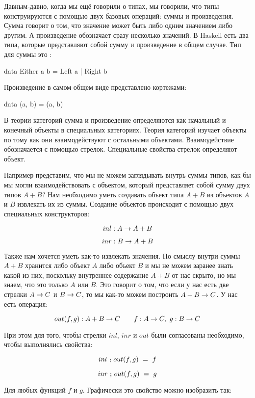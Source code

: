 Давным-давно, когда мы ещё говорили о типах, мы говорили, что типы
конструируются с помощью двух базовых операций: суммы и произведения.
Сумма говорит о том, что значение может быть либо одним значением либо
другим. А произведение обозначает сразу несколько значений. В Haskell
есть два типа, которые представляют собой сумму и произведение в общем
случае. Тип для суммы это :


\begin{code}
data Either a b = Left a | Right b
\end{code}

Произведение в самом общем виде представлено кортежами:


\begin{code}
data (a, b) = (a, b)
\end{code}

В теории категорий сумма и произведение определяются как начальный и
конечный объекты в специальных категориях. Теория категорий изучает
объекты по тому как они взаимодействуют с остальными объектами.
Взаимодействие обозначается с помощью стрелок. Специальные свойства
стрелок определяют объект.

Например представим, что мы не можем заглядывать внутрь суммы типов, как
бы мы могли взаимодействовать с объектом, который представляет собой
сумму двух типов $A+B$? Нам необходимо уметь создавать объект типа $A+B$
из объектов $A$ и $B$ извлекать их из суммы. Создание объектов
происходит с помощью двух специальных конструкторов:

\[inl : A \rightarrow A+B\]

\[inr : B \rightarrow A+B\]

Также нам хочется уметь как-то извлекать значения. По смыслу внутри
суммы $A+B$ хранится либо объект $A$ либо объект $B$ и мы не можем
заранее знать какой из них, поскольку внутреннее содержание $A+B$ от нас
скрыто, но мы знаем, что это только $A$ или $B$. Это говорит о том, что
если у нас есть две стрелки $A \rightarrow C$ и $B \rightarrow C$, то мы как-то можем
построить $A+B \rightarrow C$. У нас есть операция:

\[out(f,g) : A+B \rightarrow C \qquad f : A \rightarrow C,\ g : B \rightarrow C\]

При этом для того, чтобы стрелки $inl$, $inr$ и $out$ были согласованы
необходимо, чтобы выполнялись свойства:

\[inl \footnotesize\textbf{~;~}\normalsize out(f,g)\ =\ f\]

\[inr \footnotesize\textbf{~;~}\normalsize out(f,g)\ =\ g\]

Для любых функций $f$ и $g$. Графически это свойство можно изобразить
так:

